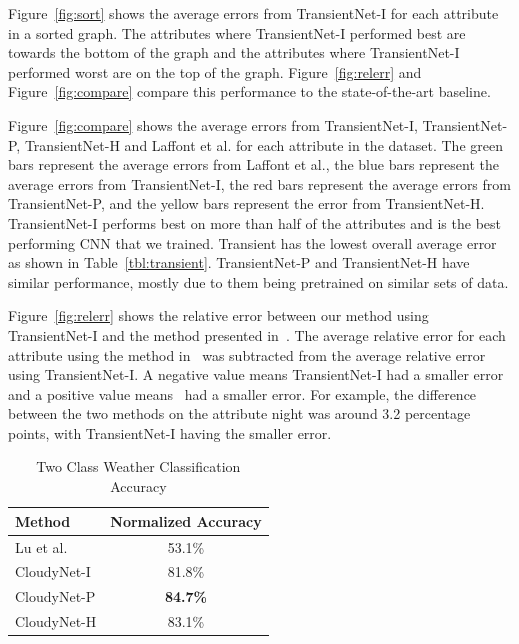 \documentclass{article}
\newcommand{\figref}[1]{Figure~\ref{fig:#1}}
\newcommand{\tblref}[1]{Table~\ref{tbl:#1}}
\begin{document}
\figref{sort} shows the average errors from TransientNet-I for each attribute
in a sorted graph.  The attributes where TransientNet-I performed best are towards
the bottom of the graph and the attributes where TransientNet-I performed
worst are on the top of the graph. \figref{relerr} and \figref{compare} 
compare this performance to the state-of-the-art baseline.

\figref{compare} shows the average errors from TransientNet-I, TransientNet-P, 
TransientNet-H and Laffont et al. for each attribute in the dataset.  The green bars 
represent the average errors from Laffont et al., the blue bars represent the average 
errors from TransientNet-I, the red bars represent the average errors from TransientNet-P, 
and the yellow bars represent the error from TransientNet-H. TransientNet-I performs best on 
more than half of the attributes and is the best performing CNN that we trained.  
Transient has the lowest overall average error as shown in \tblref{transient}.  TransientNet-P
and TransientNet-H have similar performance, mostly due to them being pretrained on similar 
sets of data.

\figref{relerr} shows the relative error between our method using TransientNet-I
and the method presented in~\cite{Laffont14}.  The average relative error 
for each attribute using the method in~\cite{Laffont14} was subtracted from
the average relative error using TransientNet-I.  A negative value means TransientNet-I
had a smaller error and a positive value means~\cite{Laffont14} had a smaller
error.  For example, the difference between the two methods on the attribute
night was around 3.2 percentage points, with TransientNet-I having the smaller 
error.

 
%
%
%

\begin{table}[t]
	\centering
	\begin{tabular}{ | l | c | }
		\hline
			Method & Normalized Accuracy \\ \hline
			Lu et al.~\cite{lutwoclass}& 53.1\% \\ \hline
			CloudyNet-I & 81.8\% \\ \hline
			CloudyNet-P & \textbf{84.7\%} \\ \hline
			CloudyNet-H & 83.1\% \\ 
		\hline
	\end{tabular}
	\caption{Two Class Weather Classification Accuracy}
	\label{tbl:twoclass}
\end{table}
\end{document}

